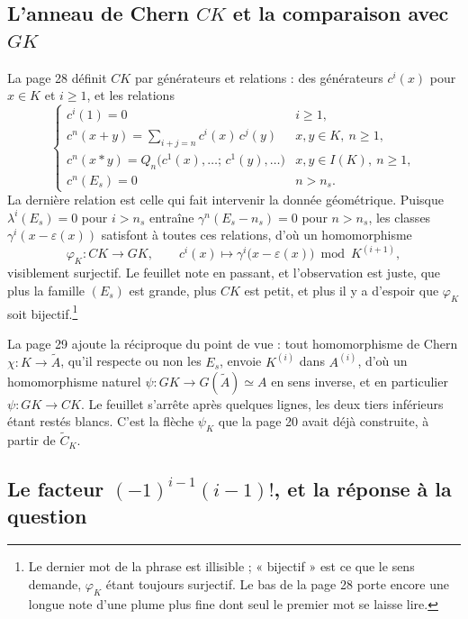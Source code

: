\documentclass[11pt,a4paper]{article}
\begin{document}
\subsection*{L'anneau de Chern $CK$ et la comparaison avec $GK$}

La page 28 définit $CK$ par générateurs et relations : des générateurs
$c^{i}(x)$ pour $x \in K$ et $i \geqslant 1$, et les relations
\[
  \begin{cases}
    c^{i}(1) = 0 & i \geqslant 1, \\[3pt]
    c^{n}(x+y) = \displaystyle\sum_{i+j=n} c^{i}(x)\,c^{j}(y)
      & x, y \in K,\ n \geqslant 1, \\[8pt]
    c^{n}(x \ast y) = Q_{n}\bigl(c^{1}(x), \ldots ;\, c^{1}(y), \ldots\bigr)
      & x, y \in I(K),\ n \geqslant 1, \\[5pt]
    c^{n}(E_{s}) = 0 & n > n_{s}.
  \end{cases}
\]
La dernière relation est celle qui fait intervenir la donnée géométrique.
Puisque $\lambda^{i}(E_{s}) = 0$ pour $i > n_{s}$ entraîne $\gamma^{n}(E_{s} -
n_{s}) = 0$ pour $n > n_{s}$, les classes $\gamma^{i}(x - \varepsilon(x))$
satisfont à toutes ces relations, d'où un homomorphisme
\[
  \varphi_{K} : CK \longrightarrow GK, \qquad
  c^{i}(x) \longmapsto \gamma^{i}\bigl(x - \varepsilon(x)\bigr) \bmod K^{(i+1)},
\]
visiblement surjectif. Le feuillet note en passant, et l'observation
est juste, que plus la famille $(E_{s})$ est grande, plus $CK$ est petit, et plus
il y a d'espoir que $\varphi_{K}$ soit bijectif.\footnote{Le dernier mot de la
phrase est illisible ; « bijectif » est ce que le sens demande, $\varphi_{K}$
étant toujours surjectif. Le bas de la page 28 porte encore une longue note
d'une plume plus fine dont seul le premier mot se laisse lire.}

La page 29 ajoute la réciproque du point de vue : tout homomorphisme de Chern
$\chi : K \to \widetilde{A}$, qu'il respecte ou non les $E_{s}$, envoie
$K^{(i)}$ dans $A^{(i)}$, d'où un homomorphisme naturel
$\psi : GK \to G(\widetilde{A}) \simeq A$ en sens inverse, et en particulier
$\psi : GK \to CK$. Le feuillet s'arrête après quelques lignes, les deux tiers
inférieurs étant restés blancs. C'est la flèche $\psi_{K}$ que la page 20
avait déjà construite, à partir de $\widetilde{C}_{K}$.

\subsection*{Le facteur $(-1)^{i-1}(i-1)!$, et la réponse à la question}
\end{document}
